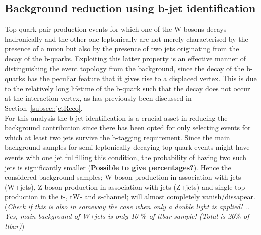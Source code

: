\subsection{Background reduction using b-jet identification}\label{subsec::BTag}

Top-quark pair-production events for which one of the W-bosons decays hadronically and the other one leptonically are not merely characterised by the presence of a muon but also by the presence of two jets originating from the decay of the b-quarks.
Exploiting this latter property is an effective manner of distinguishing the event topology from the background, since the decay of the b-quarks has the peculiar feature that it gives rise to a displaced vertex. This is due to the relatively long lifetime of the b-quark such that the decay does not occur at the interaction vertex, as has previously been discussed in Section~\ref{subsec::jetReco}.
\\ 

For this analysis the b-jet identification is a crucial asset in reducing the background contribution since there has been opted for only selecting events for which at least two jets survive the b-tagging requirement. Since the main background samples for semi-leptonically decaying top-quark events might have events with one jet fullfilling this condition, the probability of having two such jets is significantly smaller (\textbf{Possible to give percentages?}). Hence the considered background samples; W-boson production in association with jets (W+jets), Z-boson production in association with jets (Z+jets) and single-top production in the t-, tW- and s-channel; will almost completely vanish/dissapear. (\textit{Check if this is also in someway the case when only a double light is applied! .. Yes, main background of W+jets is only 10 $\%$ of ttbar sample! (Total is 20$\%$ of ttbar)})
\\

